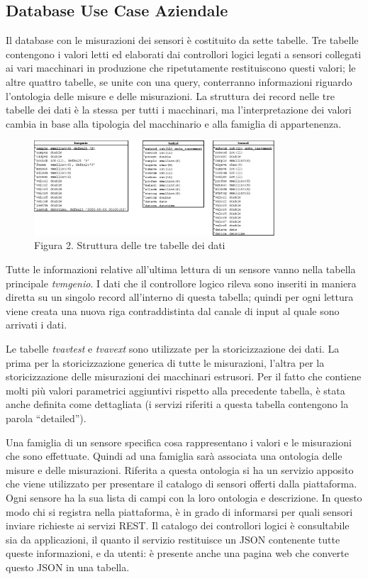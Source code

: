 \subsection{Database Use Case Aziendale}
Il database con le misurazioni dei sensori è costituito da sette tabelle. Tre tabelle contengono i valori letti ed elaborati dai controllori logici legati a sensori collegati ai vari macchinari in produzione che ripetutamente restituiscono questi valori; le altre quattro tabelle, se unite con una query, conterranno informazioni riguardo l’ontologia delle misure e delle misurazioni. La struttura dei record nelle tre tabelle dei dati è la stessa per tutti i macchinari, ma l’interpretazione dei valori cambia in base alla tipologia del macchinario e alla famiglia di appartenenza.
\begin{figure}[H]
	\centering
	\includegraphics[width=0.8\textwidth]{tabelle-backend.png}
	\caption*{Figura 2.  Struttura delle tre tabelle dei dati}
\end{figure}
Tutte le informazioni relative all’ultima lettura di un sensore vanno nella tabella principale \textit{tvmgenio}. I dati che il controllore logico rileva sono inseriti in maniera diretta su un singolo record all’interno di questa tabella; quindi per ogni lettura viene creata una nuova riga contraddistinta dal canale di input al quale sono arrivati i dati. 

Le tabelle \textit{tvavtest} e \textit{tvavext} sono utilizzate per la storicizzazione dei dati. La prima per la storicizzazione generica di tutte le misurazioni, l’altra per la storicizzazione delle misurazioni dei macchinari estrusori. Per il fatto che contiene molti più valori parametrici aggiuntivi rispetto alla precedente tabella, è stata anche definita come dettagliata (i servizi riferiti a questa tabella contengono la parola “detailed”).


Una famiglia di un sensore specifica cosa rappresentano i valori e le misurazioni che sono effettuate. Quindi ad una famiglia sarà associata una ontologia delle misure e delle misurazioni. Riferita a questa ontologia si ha un servizio apposito che viene utilizzato per presentare il catalogo di sensori offerti dalla piattaforma. Ogni sensore ha la sua lista di campi con la loro ontologia e descrizione. In questo modo chi si registra nella piattaforma, è in grado di informarsi per quali sensori inviare richieste ai servizi REST. Il catalogo dei controllori logici è consultabile sia da applicazioni, il quanto il servizio restituisce un JSON contenente tutte queste informazioni, e da utenti: è presente anche una pagina web che converte questo JSON in una tabella.

